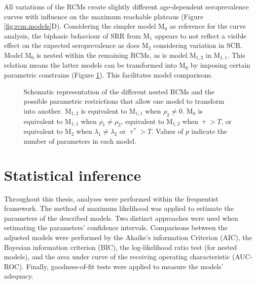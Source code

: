 All variations of the RCMs create slightly different age-dependent seroprevalence curves with influence on the maximum reachable plateaus (Figure \ref{fig:rcm.models}D).
Considering the simpler model M$_{0}$ as reference for the curve analysis, the biphasic behaviour of SRR from M$_{1}$ appears to not reflect a visible effect on the expected seroprevalence as does M$_{2}$ considering variation in SCR.
Model M$_{0}$ is nested within the remaining RCMs, as is model M$_{1,2}$ in M$_{1,1}$.
This relation means the latter models can be transformed into M$_0$ by imposing certain parametric constrains (Figure \ref{fig:lrt.rcm.models}).
This facilitates model comparisons.

\begin{figure}[H]
    \center
    \scalebox{1.05}{}
    \caption[Nested reverse catalytic models]{Schematic representation of the different nested RCMs and the possible parametric restrictions that allow one model to transform into another. M$_{1,2}$ is equivalent to M$_{1,1}$ when $\rho_2\neq0$. M$_{0}$ is equivalent to M$_{1,1}$ when $\rho_1\neq\rho_2$, equivalent to M$_{1,2}$ when $\uptau>T$, or equivalent to M$_{2}$ when $\lambda_1\neq\lambda_2$ or $\uptau^*>T$.
    Values of $p$ indicate the number of parameters in each model.}
    \label{fig:lrt.rcm.models}
\end{figure}



\section{Statistical inference}
\label{sec:inference}

Throughout this thesis, analyses were performed within the frequentist framework.
The method of maximum likelihood was applied to estimate the parameters of the described models.
Two distinct approaches were used when estimating the parameters' confidence intervals.
Comparisons between the adjusted models were performed by the Akaike's information Criterion (AIC), the Bayesian information criterion (BIC), the log-likelihood ratio test (for nested models), and the area under curve of the receiving operating characteristic (AUC-ROC).
Finally, goodness-of-fit tests were applied to measure the models' adequacy.

